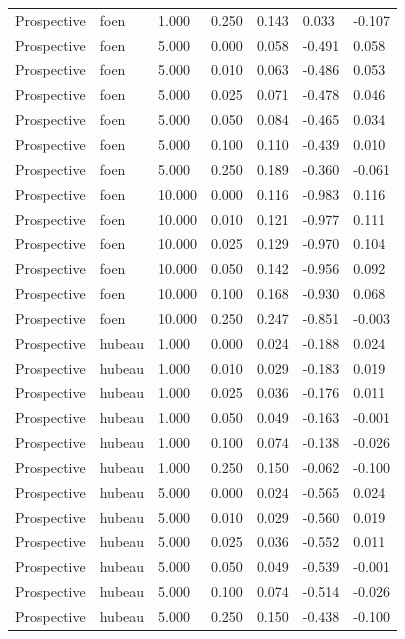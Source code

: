 {\begin{longtable}{p{}p{}p{}p{}p{}p{}p{}}
Prospective & foen & 1.000 & 0.250 & 0.143 & 0.033 & -0.107 \\
Prospective & foen & 5.000 & 0.000 & 0.058 & -0.491 & 0.058 \\
Prospective & foen & 5.000 & 0.010 & 0.063 & -0.486 & 0.053 \\
Prospective & foen & 5.000 & 0.025 & 0.071 & -0.478 & 0.046 \\
Prospective & foen & 5.000 & 0.050 & 0.084 & -0.465 & 0.034 \\
Prospective & foen & 5.000 & 0.100 & 0.110 & -0.439 & 0.010 \\
Prospective & foen & 5.000 & 0.250 & 0.189 & -0.360 & -0.061 \\
Prospective & foen & 10.000 & 0.000 & 0.116 & -0.983 & 0.116 \\
Prospective & foen & 10.000 & 0.010 & 0.121 & -0.977 & 0.111 \\
Prospective & foen & 10.000 & 0.025 & 0.129 & -0.970 & 0.104 \\
Prospective & foen & 10.000 & 0.050 & 0.142 & -0.956 & 0.092 \\
Prospective & foen & 10.000 & 0.100 & 0.168 & -0.930 & 0.068 \\
Prospective & foen & 10.000 & 0.250 & 0.247 & -0.851 & -0.003 \\
Prospective & hubeau & 1.000 & 0.000 & 0.024 & -0.188 & 0.024 \\
Prospective & hubeau & 1.000 & 0.010 & 0.029 & -0.183 & 0.019 \\
Prospective & hubeau & 1.000 & 0.025 & 0.036 & -0.176 & 0.011 \\
Prospective & hubeau & 1.000 & 0.050 & 0.049 & -0.163 & -0.001 \\
Prospective & hubeau & 1.000 & 0.100 & 0.074 & -0.138 & -0.026 \\
Prospective & hubeau & 1.000 & 0.250 & 0.150 & -0.062 & -0.100 \\
Prospective & hubeau & 5.000 & 0.000 & 0.024 & -0.565 & 0.024 \\
Prospective & hubeau & 5.000 & 0.010 & 0.029 & -0.560 & 0.019 \\
Prospective & hubeau & 5.000 & 0.025 & 0.036 & -0.552 & 0.011 \\
Prospective & hubeau & 5.000 & 0.050 & 0.049 & -0.539 & -0.001 \\
Prospective & hubeau & 5.000 & 0.100 & 0.074 & -0.514 & -0.026 \\
Prospective & hubeau & 5.000 & 0.250 & 0.150 & -0.438 & -0.100 \\

\end{longtable}}
